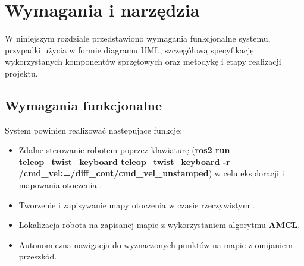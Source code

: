 \documentclass[a4paper,twoside,12pt]{book}
\newtheorem{Definition}{Definicja}
\newtheorem{Example}{Przykład}
\newtheorem{Theorem}{Twierdzenie}
\begin{document}
%
%





\chapter{Wymagania i narzędzia}
\label{ch:wymagania-i-narzedzia}

W niniejszym rozdziale przedstawiono wymagania funkcjonalne systemu, przypadki użycia w formie diagramu UML, szczegółową specyfikację wykorzystanych komponentów sprzętowych oraz metodykę i etapy realizacji projektu.

\section{Wymagania funkcjonalne}
System powinien realizować następujące funkcje:
\begin{itemize}
\item Zdalne sterowanie robotem poprzez klawiaturę (\textbf{ros2 run teleop\_twist\_keyboard teleop\_twist\_keyboard -r /cmd\_vel:=/diff\_cont/cmd\_vel\_unstamped}) w celu eksploracji i mapowania otoczenia \cite{bib:teleop}.
\item Tworzenie i zapisywanie mapy otoczenia w czasie rzeczywistym .
\item Lokalizacja robota na zapisanej mapie z wykorzystaniem algorytmu \textbf{AMCL}.
\item Autonomiczna nawigacja do wyznaczonych punktów na mapie z omijaniem przeszkód.

\end{itemize}
\newpage
\end{document}
